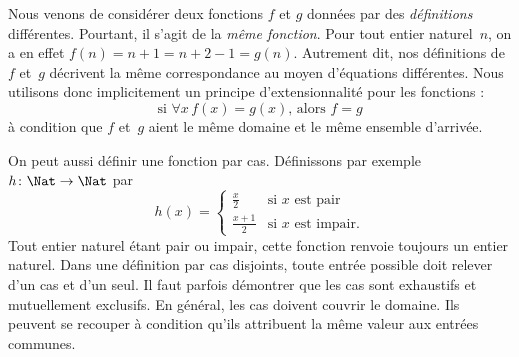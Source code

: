 \documentclass[../../../include/open-logic-section]{subfiles}
\begin{document}
\begin{explain}
Nous venons de considérer deux fonctions $f$ et $g$ données par des
\emph{définitions} différentes. Pourtant, il s’agit de la \emph{même fonction}.
Pour tout entier naturel~$n$, on a en effet
$f(n) = n+1 = n+2-1 = g(n)$. Autrement dit, nos définitions de $f$ et~$g$
décrivent la même correspondance au moyen d’équations différentes.
Nous utilisons donc implicitement un principe d’extensionnalité
pour les fonctions :
\[
  \text{si }\forall x\, f(x) = g(x)\text{, alors }f = g
\]
à condition que $f$ et~$g$ aient le même domaine et le même ensemble d’arrivée.
\end{explain}

\begin{ex}
On peut aussi définir une fonction par cas. Définissons par exemple
$h \colon \Nat \to \Nat$ par
\[
h(x) =
\begin{cases}
  \frac{x}{2} & \text{si $x$ est pair} \\
  \frac{x+1}{2} & \text{si $x$ est impair.}
\end{cases}
\]
Tout entier naturel étant pair ou impair, cette fonction renvoie toujours
un entier naturel. Dans une définition par cas disjoints, toute entrée
possible doit relever d’un cas et d’un seul. Il faut parfois démontrer
que les cas sont exhaustifs et mutuellement exclusifs.
En général, les cas doivent couvrir le domaine. Ils peuvent se recouper
à condition qu’ils attribuent la même valeur aux entrées communes.
%
%
\end{ex}
\end{document}

